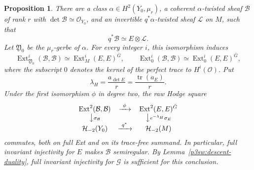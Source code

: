 \documentclass[11pt]{article}
\newtheorem{proposition}[theorem]{Proposition}
\numberwithin{equation}{section}
\begin{document}
\begin{proposition}
\label{p3sw:twisted-descent}
There are a class \(\alpha\in H^2(Y_0,\mu_r)\), a coherent
\(\alpha\)-twisted sheaf \(\mathcal B\) of rank \(r\) with
\(\det\mathcal B\simeq\mathcal O_{Y_0}\), and an invertible
\(q^*\alpha\)-twisted sheaf \(\mathcal L\) on \(M\), such that
\begin{equation}
\label{p3sw:descent-twisted-pullback}
 q^*\mathcal B\simeq E\otimes\mathcal L.
\end{equation}
Let \(\mathfrak Y_0\) be the \(\mu_r\)-gerbe of \(\alpha\).  For every
integer \(i\), this isomorphism induces
\begin{equation}
\label{p3sw:descent-ext}
 \operatorname{Ext}^i_{\mathfrak Y_0}(\mathcal B,\mathcal B)
   \simeq\operatorname{Ext}^i_M(E,E)^{\bar G},\qquad
 \operatorname{Ext}^i_0(\mathcal B,\mathcal B)
   \simeq\operatorname{Ext}^i_0(E,E)^{\bar G},
\end{equation}
where the subscript \(0\) denotes the kernel of the perfect trace to
\(H^i(\mathcal O)\).  Put
\[
 \lambda_H=\frac{a_{\det E}}r=\frac{\operatorname{tr}(a_E)}r.
\]
Under the first isomorphism \(\phi\) in degree two, the raw Hodge square
\begin{equation}
\label{p3sw:descent-square}
\begin{array}{ccc}
 \operatorname{Ext}^2(\mathcal B,\mathcal B)&
       \xrightarrow{\ \phi\ }&\operatorname{Ext}^2(E,E)^{\bar G}\\
 \big\downarrow{\scriptstyle\sigma_{\mathcal B}}&&
       \big\downarrow{\scriptstyle e^{-\lambda_H}\sigma_E}\\
 \mathcal H_{-2}(Y_0)&\xrightarrow{\ q^*\ }&\mathcal H_{-2}(M)
\end{array}
\end{equation}
commutes, both on full Ext and on its trace-free summand.  In particular,
full invariant injectivity for \(E\) makes \(\mathcal B\) semiregular.
By Lemma~\ref{p3sw:descent-duality}, full invariant injectivity for
\(\mathcal G\) is sufficient for this conclusion.
\end{proposition}
\end{document}
